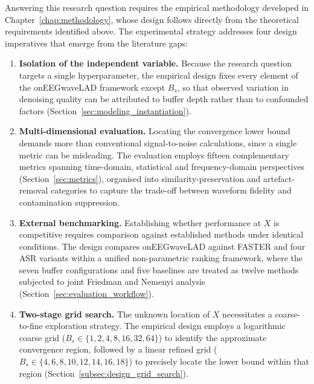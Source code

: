 \documentclass[MScCS,12pt,oneside,final]{uccthesis}
\begin{document}
    Answering this research question requires the empirical methodology developed in Chapter~\ref{chap:methodology}, whose design follows directly from the theoretical requirements identified above. The experimental strategy addresses four design imperatives that emerge from the literature gaps:
    
    \begin{enumerate}
        \item \textbf{Isolation of the independent variable.} Because the research question targets a single hyperparameter, the empirical design fixes every element of the onEEGwaveLAD framework except $B_s$, so that observed variation in denoising quality can be attributed to buffer depth rather than to confounded factors (Section~\ref{sec:modeling_instantiation}).
        
        \item \textbf{Multi-dimensional evaluation.} Locating the convergence lower bound demands more than conventional signal-to-noise calculations, since a single metric can be misleading. The evaluation employs fifteen complementary metrics spanning time-domain, statistical and frequency-domain perspectives (Section~\ref{sec:metrics}), organised into similarity-preservation and artefact-removal categories to capture the trade-off between waveform fidelity and contamination suppression.
        
        \item \textbf{External benchmarking.} Establishing whether performance at $X$ is competitive requires comparison against established methods under identical conditions. The design compares onEEGwaveLAD against FASTER and four ASR variants within a 
unified non-parametric ranking framework, where the seven buffer configurations 
and five baselines are treated as twelve methods subjected to joint Friedman and 
Nemenyi analysis (Section~\ref{sec:evaluation_workflow}).
        
        \item \textbf{Two-stage grid search.} The unknown location of $X$ necessitates a coarse-to-fine exploration strategy. The empirical design employs a logarithmic coarse grid ($B_s \in \{1, 2, 4, 8, 16, 32, 64\}$) to identify the approximate convergence region, followed by a linear refined grid ($B_s \in \{4, 6, 8, 10, 12, 14, 16, 18\}$) to precisely locate the lower bound within that region (Section~\ref{subsec:design_grid_search}).
    \end{enumerate}
    
\end{document}
